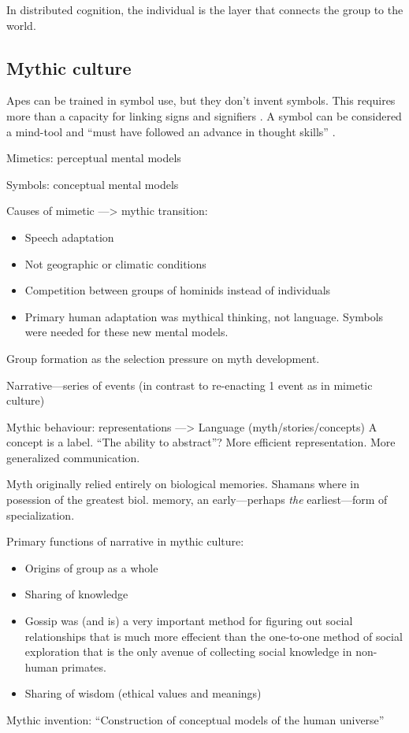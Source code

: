 \documentclass{article}
\begin{document}
In distributed cognition, the individual is the layer that connects the group to the world.

\subsection{Mythic culture}

Apes can be trained in symbol use, but they don't invent symbols. This requires more than a capacity for linking signs and signifiers \citep[p.~217-220]{donald1991}. A symbol can be considered a mind-tool \citep{gregory1981} and ``must have followed an advance in thought skills'' \citep[p.219]{donald1991}.

Mimetics: perceptual mental models

Symbols: conceptual mental models

Causes of mimetic ---> mythic transition:
\begin{itemize}
  \item Speech adaptation
  \item Not geographic or climatic conditions
  \item Competition between groups of hominids instead of individuals %
  \item Primary human adaptation was mythical thinking, not language. Symbols were needed for these new mental models.
\end{itemize}

Group formation as the selection pressure on myth development.

Narrative---series of events (in contrast to re-enacting 1 event as in mimetic culture)

Mythic behaviour: representations ---> Language (myth/stories/concepts) A concept is a label.
“The ability to abstract”?
More efficient representation.
More generalized communication.

Myth originally relied entirely on biological memories. Shamans where in posession of the greatest biol. memory, an early---perhaps \emph{the} earliest---form of specialization.

Primary functions of narrative in mythic culture: 
\begin{itemize}
  \item Origins of group as a whole
  \item Sharing of knowledge
  \item Gossip was (and is) a very important method for figuring out social relationships that is much more effecient than the one-to-one method of social exploration that is the only avenue of collecting social knowledge in non-human primates.
  \item Sharing of wisdom (ethical values and meanings)
\end{itemize}
Mythic invention: “Construction of conceptual models of the human universe”
\end{document}
